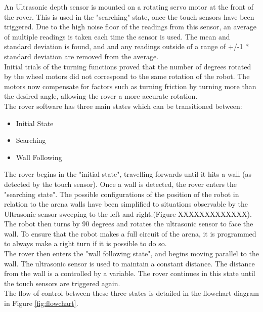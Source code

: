\documentclass[a4paper,12pt,twocolumn]{article}
\begin{document}
An Ultrasonic depth sensor is mounted on a rotating servo motor at the front of the rover. This is used in the "searching" state, once the touch sensors have been triggered. Due to the high noise floor of the readings from this sensor, an average of multiple readings is taken each time the sensor is used. The mean and standard deviation is found, and and any readings outside of a range of +/-1 * standard deviation are removed from the average.\\

Initial trials of the turning functions proved that the number of degrees rotated by the wheel motors did not correspond to the same rotation of the robot. The motors now compensate for factors such as turning friction by turning more than the desired angle, allowing the rover a more accurate rotation. \\

The rover software has three main states which can be transitioned between:
\begin{itemize}
    \item Initial State
    \item Searching
    \item Wall Following
\end{itemize}

The rover begins in the "initial state", travelling forwards until it hits a wall (as detected by the touch sensor). Once a wall is detected, the rover enters the "searching state". The possible configurations of the position of the robot in relation to the arena walls have been simplified to situations observable by the Ultrasonic sensor sweeping to the left and right.(Figure XXXXXXXXXXXXX).\\

The robot then turns by 90 degrees and rotates the ultrasonic sensor to face the wall. 
To ensure that the robot makes a full circuit of the arena, it is programmed to always make a right turn if it is possible to do so.\\

The rover then enters the "wall following state", and begins moving parallel to the wall. The ultrasonic sensor is used to maintain a constant distance. The distance from the wall is a controlled by a variable. The rover continues in this state until the touch sensors are triggered again.\\

The flow of control between these three states is detailed in the flowchart diagram in Figure \ref{fig:flowchart}.
\end{document}
